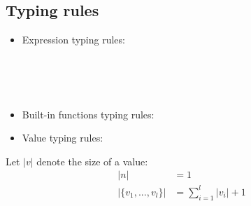 \subsection{Typing rules}
\begin{itemize}
	
	\item Expression typing rules:\\
	
	
	\\[2ex]
	
	
	\\[2ex]
	
	\\[2ex]
	
	
\item  Built-in functions typing rules:\\

	
	\PT{\Axiom{\Typef{\iotan}{\int} {\tseq{\int}}}}
	\PT{\Axiom{\Typef{\plusn}{\int,\int} {\int}}}
	
	\item Value typing rules: \\
	
	
	
\end{itemize}

\begin{nota}
Let $|v|$ denote the size of a value:
\begin{align*}
	|n| & = 1 \\
	|\{v_1,...,v_l\}| & = \sum_{i=1}^{l}|v_i| +1
\end{align*}

\end{nota}

